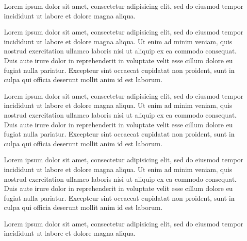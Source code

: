 \documentclass[12pt]{exam}
\begin{document}
\begin{questions}

\addpoints
\question[10] Lorem ipsum dolor sit amet, consectetur adipisicing elit, sed do eiusmod
tempor incididunt ut labore et dolore magna aliqua.
\begin{solution}
Lorem ipsum dolor sit amet, consectetur adipisicing elit, sed do eiusmod
tempor incididunt ut labore et dolore magna aliqua. Ut enim ad minim veniam,
quis nostrud exercitation ullamco laboris nisi ut aliquip ex ea commodo
consequat. Duis aute irure dolor in reprehenderit in voluptate velit esse
cillum dolore eu fugiat nulla pariatur. Excepteur sint occaecat cupidatat non
proident, sunt in culpa qui officia deserunt mollit anim id est laborum.
\end{solution}
\vfill

\addpoints
\question[10] Lorem ipsum dolor sit amet, consectetur adipisicing elit, sed do eiusmod
tempor incididunt ut labore et dolore magna aliqua. Ut enim ad minim veniam,
quis nostrud exercitation ullamco laboris nisi ut aliquip ex ea commodo
consequat. Duis aute irure dolor in reprehenderit in voluptate velit esse
cillum dolore eu fugiat nulla pariatur. Excepteur sint occaecat cupidatat non
proident, sunt in culpa qui officia deserunt mollit anim id est laborum.
\begin{solution}
Lorem ipsum dolor sit amet, consectetur adipisicing elit, sed do eiusmod
tempor incididunt ut labore et dolore magna aliqua. Ut enim ad minim veniam,
quis nostrud exercitation ullamco laboris nisi ut aliquip ex ea commodo
consequat. Duis aute irure dolor in reprehenderit in voluptate velit esse
cillum dolore eu fugiat nulla pariatur. Excepteur sint occaecat cupidatat non
proident, sunt in culpa qui officia deserunt mollit anim id est laborum.
\end{solution}
\vfill

\newpage


\addpoints
\question[10] Lorem ipsum dolor sit amet, consectetur adipisicing elit, sed do eiusmod
tempor incididunt ut labore et dolore magna aliqua.
\end{questions}
\end{document}
